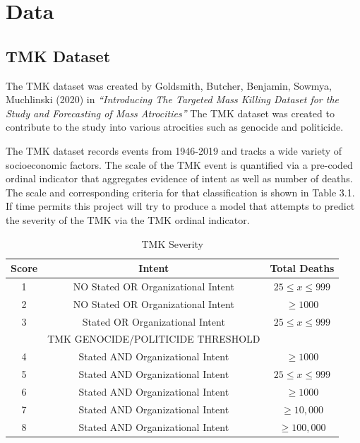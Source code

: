\chapter{Data}\label{ch:style}
\section{TMK Dataset}

The TMK dataset was created by Goldsmith, Butcher, Benjamin, Sowmya, Muchlinski (2020) in  \emph{“Introducing The Targeted Mass Killing Dataset for the Study and Forecasting of Mass Atrocities”} \cite{Goldsmith2013}
The TMK dataset was created to contribute to the study into various atrocities such as genocide and politicide. 

The TMK dataset records events from 1946-2019 and tracks a wide variety of socioeconomic factors. The scale of the TMK event is quantified via a pre-coded ordinal indicator that aggregates evidence of intent as well as number of deaths. The scale and corresponding criteria for that classification is shown in Table 3.1. If time permits this project will try to produce a model that attempts to predict the severity of the TMK via the TMK ordinal indicator.
\begin{center}
\begin{table}
\begin{center}
 \begin{tabular}{||c c c||} 
 \hline
 Score & Intent & Total Deaths\\ [1ex] 
 \hline
 1 & NO Stated OR Organizational Intent & $25 \leq x \leq 999$ \\ [1ex] 
 \hline
 2 & NO Stated OR Organizational Intent &  $\geq 1000$  \\ [1ex] 
 \hline
 3 & Stated OR Organizational Intent & $25 \leq x \leq 999$ \\ [1ex]  
 \hline
  & TMK GENOCIDE/POLITICIDE THRESHOLD & \\
 \hline
 4 & Stated AND Organizational Intent  &  $\geq 1000$  \\ [1ex] 
 \hline
  5 & Stated AND Organizational Intent  & $25 \leq x \leq 999$  \\ [1ex] 
 \hline
  6 & Stated AND Organizational Intent  &  $\geq 1000$   \\ [1ex] 
 \hline
  7 & Stated AND Organizational Intent  &  $\geq 10,000$   \\ [1ex] 
 \hline
  8 & Stated AND Organizational Intent  &  $\geq 100,000$   \\ [1ex] 
 \hline
\end{tabular}
\caption{TMK Severity}
\end{center}
\end{table}
\end{center}
\pagebreak
